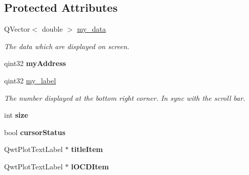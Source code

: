 \subsection*{Protected Attributes}
\begin{DoxyCompactItemize}
\item 
\mbox{\label{classdisplay__screen_a52bf41a53070ae85bdf46ee75dd84f0d}} 
Q\+Vector$<$ double $>$ \mbox{\hyperlink{classdisplay__screen_a52bf41a53070ae85bdf46ee75dd84f0d}{my\+\_\+data}}
\begin{DoxyCompactList}\small\item\em The data which are displayed on screen. \end{DoxyCompactList}\item 
\mbox{\label{classdisplay__screen_a404e8f942e20b528e8017f693eea5ea5}} 
qint32 {\bfseries my\+Address}
\item 
\mbox{\label{classdisplay__screen_aa5d0a895e06f256254d60c9a6761353a}} 
qint32 \mbox{\hyperlink{classdisplay__screen_aa5d0a895e06f256254d60c9a6761353a}{my\+\_\+label}}
\begin{DoxyCompactList}\small\item\em The number displayed at the bottom right corner. In sync with the scroll bar. \end{DoxyCompactList}\item 
\mbox{\label{classdisplay__screen_aa36da095bb12f0f4c9a5063fc9477bf8}} 
int {\bfseries size}
\item 
\mbox{\label{classdisplay__screen_aefb44f5edee20d8ec3f1e6f1cb790db4}} 
bool {\bfseries cursor\+Status}
\item 
\mbox{\label{classdisplay__screen_a456d4c817042e690b69f978fdbf16320}} 
Qwt\+Plot\+Text\+Label $\ast$ {\bfseries title\+Item}
\item 
\mbox{\label{classdisplay__screen_ae6764a9d2d77f51e93cdc34ab277d48a}} 
Qwt\+Plot\+Text\+Label $\ast$ {\bfseries l\+O\+C\+D\+Item}
\item 
\mbox{\label{classdisplay__screen_a69d982deaa57cd6d447b7408093568a6}} 

\end{DoxyCompactItemize}
